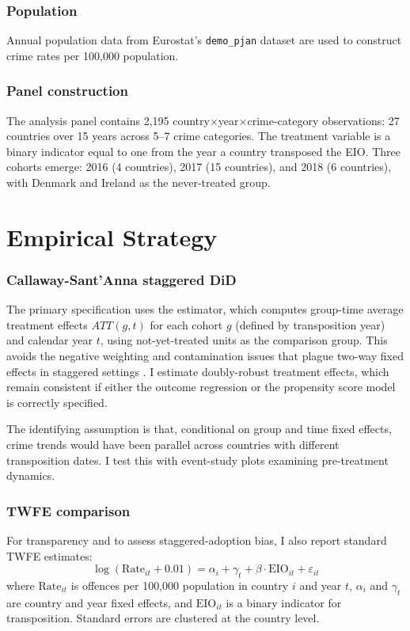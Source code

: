 \documentclass[12pt]{article}
\begin{document}
\subsubsection*{Population}  Annual population data from Eurostat's \texttt{demo\_pjan} dataset are used to construct crime rates per 100,000 population.

\subsubsection*{Panel construction}  The analysis panel contains 2,195 country$\times$year$\times$crime-category observations: 27 countries over 15 years across 5--7 crime categories. The treatment variable is a binary indicator equal to one from the year a country transposed the EIO. Three cohorts emerge: 2016 (4 countries), 2017 (15 countries), and 2018 (6 countries), with Denmark and Ireland as the never-treated group.






\section{Empirical Strategy}

\subsubsection*{Callaway-Sant'Anna staggered DiD}  The primary specification uses the \citet{callaway2021did} estimator, which computes group-time average treatment effects $ATT(g,t)$ for each cohort $g$ (defined by transposition year) and calendar year $t$, using not-yet-treated units as the comparison group. This avoids the negative weighting and contamination issues that plague two-way fixed effects in staggered settings \citep{goodman2021did, sun2021estimating, dechaisemartin2020two}. I estimate doubly-robust treatment effects, which remain consistent if either the outcome regression or the propensity score model is correctly specified.

The identifying assumption is that, conditional on group and time fixed effects, crime trends would have been parallel across countries with different transposition dates. I test this with event-study plots examining pre-treatment dynamics.

\subsubsection*{TWFE comparison}  For transparency and to assess staggered-adoption bias, I also report standard TWFE estimates:
\begin{equation}
\log(\text{Rate}_{it} + 0.01) = \alpha_i + \gamma_t + \beta \cdot \text{EIO}_{it} + \varepsilon_{it}
\end{equation}
where $\text{Rate}_{it}$ is offences per 100,000 population in country $i$ and year $t$, $\alpha_i$ and $\gamma_t$ are country and year fixed effects, and $\text{EIO}_{it}$ is a binary indicator for transposition. Standard errors are clustered at the country level.
\end{document}
